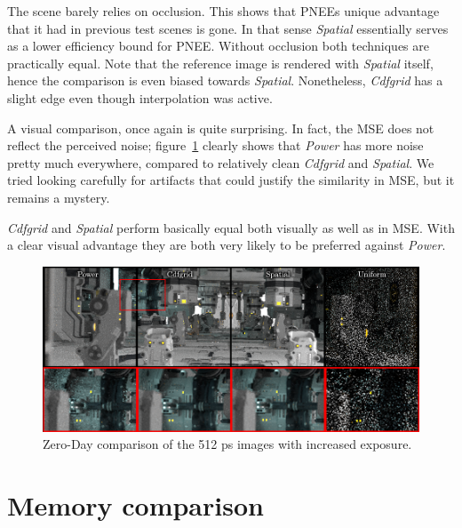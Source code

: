 The scene barely relies on occlusion. This shows that PNEEs unique advantage that it had in previous test scenes is gone. In that sense \textit{Spatial} essentially serves as a lower efficiency bound for PNEE. Without occlusion both techniques are practically equal. Note that the reference image is rendered with \textit{Spatial} itself, hence the comparison is even biased towards \textit{Spatial}. Nonetheless, \textit{Cdfgrid} has a slight edge even though interpolation was active. 

A visual comparison, once again is quite surprising. In fact, the MSE does not reflect the perceived noise; figure~\ref{fig:zdcomp} clearly shows that \textit{Power} has more noise pretty much everywhere, compared to relatively clean \textit{Cdfgrid} and \textit{Spatial}. We tried looking carefully for artifacts that could justify the similarity in MSE, but it remains a mystery.

\textit{Cdfgrid} and \textit{Spatial} perform basically equal both visually as well as in MSE. With a clear visual advantage they are both very likely to be preferred against \textit{Power}.



\begin{figure}
    \centering
    \includegraphics[width=1\textwidth]{figures/comparisons/ZDcomp_slim.png}
    \caption{Zero-Day comparison of the 512 ps images with increased exposure. }
    \label{fig:zdcomp}
\end{figure}


\FloatBarrier
\section{Memory comparison}

